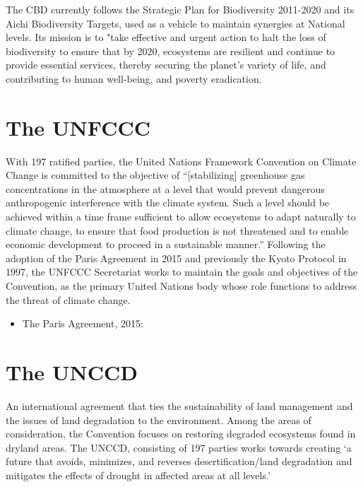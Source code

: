\documentclass[
]{book}
\providecommand{\tightlist}{%
  \setlength{\itemsep}{0pt}\setlength{\parskip}{0pt}}
\begin{document}
The CBD currently follows the Strategic Plan for Biodiversity 2011-2020 and its Aichi Biodiversity Targets, used as a vehicle to maintain synergies at National levels. Its mission is to "take effective and urgent action to halt the loss of biodiversity to ensure that by 2020, ecosystems are resilient and continue to provide essential services, thereby securing the planet's variety of life, and contributing to human well-being, and poverty eradication.

\hypertarget{the-unfccc}{%
\section{The UNFCCC}\label{the-unfccc}}

With 197 ratified parties, the United Nations Framework Convention on Climate Change is committed to the objective of ``{[}stabilizing{]} greenhouse gas concentrations in the atmosphere at a level that would prevent dangerous anthropogenic interference with the climate system. Such a level should be achieved within a time frame sufficient to allow ecosystems to adapt naturally to climate change, to ensure that food production is not threatened and to enable economic development to proceed in a sustainable manner.'' Following the adoption of the Paris Agreement in 2015 and previously the Kyoto Protocol in 1997, the UNFCCC Secretariat works to maintain the goals and objectives of the Convention, as the primary United Nations body whose role functions to address the threat of climate change.

\begin{itemize}
\tightlist
\item
  The Paris Agreement, 2015:
\end{itemize}

\hypertarget{the-unccd}{%
\section{The UNCCD}\label{the-unccd}}

An international agreement that ties the sustainability of land management and the issues of land degradation to the environment. Among the areas of consideration, the Convention focuses on restoring degraded ecosystems found in dryland areas. The UNCCD, consisting of 197 parties works towards creating `a future that avoids, minimizes, and reverses desertification/land degradation and mitigates the effects of drought in affected areas at all levels.'
\end{document}
